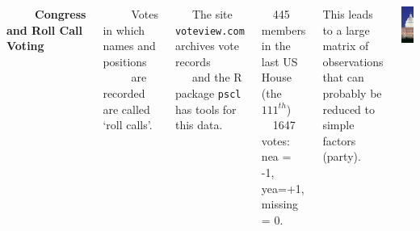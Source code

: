 \documentclass[11pt,xcolor=svgnames]{beamer}
\newcommand{\theme}{\color{Maroon}}
\newcommand{\bk}{\color{black}}
\newcommand{\gr}{\color{black!60}}
\newcommand{\sg}{\color{DarkSlateGray}}
\newcommand{\nv}{\color{Navy}}
\newcommand{\sk}{\vspace{.5cm}}
\begin{document}
\begin{frame}

\begin{columns}

\column{3.5in}

~~~~~{\bf Congress and \theme Roll Call Voting}

\sk\sg
~~~~~Votes in which names and positions \\~~~~~are recorded are called `roll calls'.

\sk\gr
~~~The site {\tt voteview.com} archives vote records\\
~~~and the R package { \tt pscl} has tools for this data.

\sk\sg
~~445 members in the last US House 
(the $111^{th}$)\\
~~1647 votes: 
\theme nea = -1, \nv yea=+1, \gr missing = 0.

\sk\bk
This leads to a large matrix of observations that can probably be
reduced to simple factors {\gr (party)}.


\column{1in}
 \includegraphics[width=1.25in]{../graphs/USCongress}
\end{columns}
\end{frame}
\end{document}
